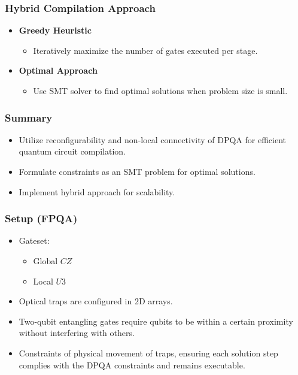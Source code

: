 \documentclass[18 pt]{beamer}
\begin{document}
\begin{frame}
    \frametitle{Hybrid Compilation Approach}
    \begin{itemize}
        \item \textbf{Greedy Heuristic}
        \begin{itemize}
            \item Iteratively maximize the number of gates executed per stage.
        \end{itemize}
        \item \textbf{Optimal Approach}
        \begin{itemize}
            \item Use SMT solver to find optimal solutions when problem size is small.
        \end{itemize}
    \end{itemize}
\end{frame}

\begin{frame}
    \frametitle{Summary}
    \begin{itemize}
        \item Utilize reconfigurability and non-local connectivity of DPQA for efficient quantum circuit compilation.
        \item Formulate constraints as an SMT problem for optimal solutions.
        \item Implement hybrid approach for scalability.
    \end{itemize}
\end{frame}

\begin{frame}
    \frametitle{Setup (FPQA)}
    \begin{itemize}
        \item Gateset:
        \begin{itemize}
            \item Global $CZ$
            \item Local $U3$
        \end{itemize}
        \item Optical traps are configured in 2D arrays.
        \item Two-qubit entangling gates require qubits to be within a certain proximity without interfering with others.
        \item Constraints of physical movement of traps, ensuring each solution step complies with the DPQA constraints and remains executable.
    \end{itemize}
\end{frame}
\end{document}
